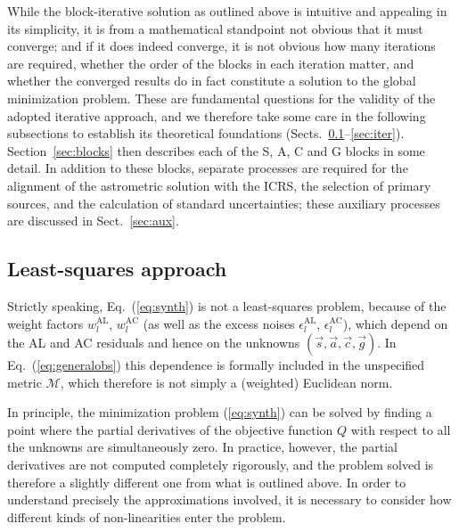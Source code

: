 \documentclass[structabstract]{aa}
\begin{document}
While the block-iterative solution as outlined above is intuitive and appealing in
its simplicity, it is from a mathematical standpoint not obvious that it must converge;
and if it does indeed converge, it is not obvious how
many iterations are required, whether the order of the blocks in each iteration
matter, and whether the converged results do in fact constitute a solution to the
global minimization problem. These are fundamental questions for the validity of
the adopted iterative approach, and we therefore take some care in the following
subsections to establish its theoretical foundations 
(Sects.~\ref{sec:lsqr}--\ref{sec:iter}). Section~\ref{sec:blocks} then describes
each of the S, A, C and G blocks in some detail.
In addition to these blocks, separate processes are required for the alignment 
of the astrometric solution with the ICRS, the selection of primary sources,
and the calculation of standard uncertainties; these auxiliary processes are discussed 
in Sect.~\ref{sec:aux}.


\subsection{Least-squares approach} \label{sec:lsqr}

Strictly speaking, Eq.~(\ref{eq:synth}) is not a least-squares problem, because
of the weight factors $w_l^\text{AL}$, $w_l^\text{AC}$ (as well as the excess
noises $\epsilon_l^\text{AL}$, $\epsilon_l^\text{AC}$), which depend on the AL and
AC residuals and hence on the unknowns $(\vec{s},\vec{a},\vec{c},\vec{g})$.
In Eq.~(\ref{eq:generalobs}) this dependence is formally included in the unspecified
metric $\mathcal{M}$, which therefore is not simply a (weighted) Euclidean norm.

In principle, the minimization problem (\ref{eq:synth}) can be solved by finding
a point where the partial derivatives of the objective function $Q$ with respect to
all the unknowns are simultaneously zero.
In practice, however, the partial derivatives are not computed completely rigorously,
and the problem solved is therefore a slightly different one from what is outlined
above. In order to understand precisely the approximations involved, it is necessary
to consider how different kinds of non-linearities enter the problem.
\end{document}
